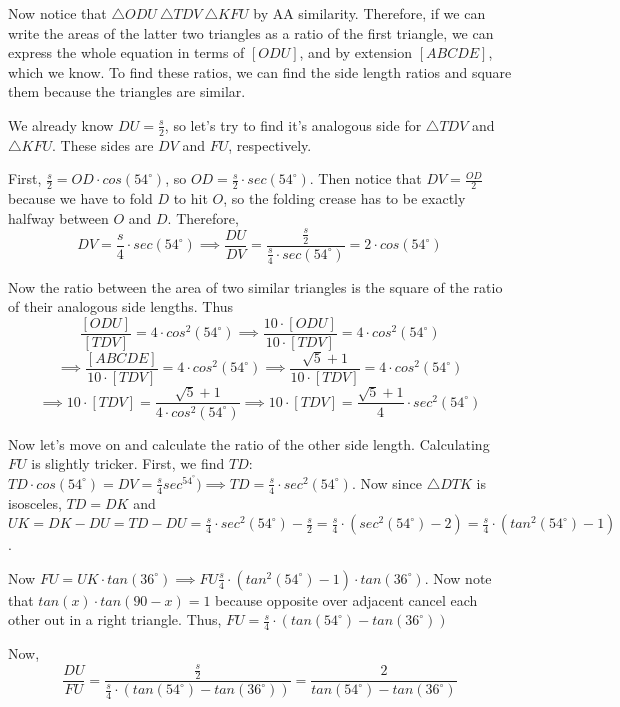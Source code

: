\begin{enumerate}
 Now notice that $\triangle ODU  ~ \triangle TDV ~ \triangle KFU$ by AA similarity. Therefore, if we can write the areas of the latter two triangles as a ratio of the first triangle, we can express the whole equation in terms of $[ODU]$, and by extension $[ABCDE]$, which we know. To find these ratios, we can find the side length ratios and square them because the triangles are similar.

 We already know $DU = \frac{s}{2}$, so let's try to find it's analogous side for $\triangle TDV$ and $\triangle KFU$. These sides are $DV$ and $FU$, respectively. 

 First, $\frac{s}{2} = OD \cdot cos(54^{\circ})$, so $OD = \frac{s}{2} \cdot sec(54^{\circ})$. Then notice that $DV = \frac{OD}{2}$ because we have to fold $D$ to hit $O$, so the folding crease has to be exactly halfway between $O$ and $D$. Therefore, 
 \[DV = \frac{s}{4} \cdot sec(54^{\circ}) \implies \frac{DU}{DV} = \frac{\frac{s}{2}}{\frac{s}{4} \cdot sec(54^{\circ})} = 2 \cdot cos(54^{\circ})\]

 Now the ratio between the area of two similar triangles is the square of the ratio of their analogous side lengths. Thus
 \[\frac{[ODU]}{[TDV]} = 4 \cdot cos^2(54^{\circ}) \implies \frac{10 \cdot [ODU]}{10 \cdot [TDV]} = 4 \cdot cos^2(54^{\circ})\]
 \[\implies \frac{[ABCDE]}{10 \cdot [TDV]} = 4 \cdot cos^2(54^{\circ}) \implies \frac{\sqrt{5}+1}{10 \cdot [TDV]} = 4 \cdot cos^2(54^{\circ})\]
 \[\implies 10 \cdot [TDV] = \frac{\sqrt{5}+1}{4 \cdot cos^2(54^{\circ})} \implies 10 \cdot [TDV] = \frac{\sqrt{5}+1}{4} \cdot sec^2(54^{\circ})\]

 Now let's move on and calculate the ratio of the other side length. Calculating $FU$ is slightly tricker. First, we find $TD$: $TD \cdot cos(54^{\circ}) = DV = \frac{s}{4} sec^54^{\circ}) \implies TD = \frac{s}{4} \cdot sec^2(54^{\circ})$. Now since $\triangle DTK$ is isosceles, $TD = DK$ and $UK = DK-DU = TD-DU = \frac{s}{4} \cdot sec^2(54^{\circ})-\frac{s}{2} = \frac{s}{4} \cdot (sec^2(54^{\circ})-2) = \frac{s}{4} \cdot (tan^2(54^{\circ})-1)$.

 Now $FU = UK \cdot tan(36^{\circ}) \implies FU \frac{s}{4} \cdot (tan^2(54^{\circ})-1) \cdot tan(36^{\circ})$. Now note that $tan(x) \cdot tan(90-x) = 1$ because opposite over adjacent cancel each other out in a right triangle. Thus, $FU = \frac{s}{4} \cdot (tan(54^{\circ})-tan(36^{\circ}))$ 

 Now, 
 \[\frac{DU}{FU} = \frac{\frac{s}{2}}{\frac{s}{4} \cdot (tan(54^{\circ})-tan(36^{\circ}))} = \frac{2}{tan(54^{\circ})-tan(36^{\circ})}\]


\end{enumerate}
